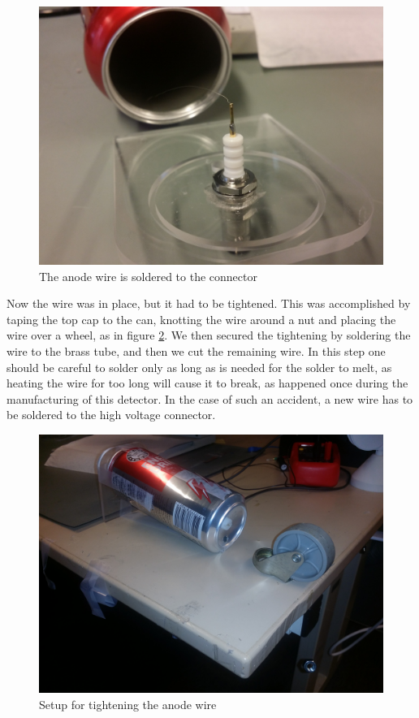 \documentclass[a4paper]{article}
\begin{document}
\begin{figure}[ht!]
\centering
\includegraphics[width=\textwidth]{fig/IMG_20201117_121044.jpg}
\caption{The anode wire is soldered to the connector}
\label{fig:connector}
\end{figure}

Now the wire was in place, but it had to be tightened.
This was accomplished by taping the top cap to the can, knotting the wire around a nut and placing the wire over a wheel, as in figure \ref{fig:tightening}.
We then secured the tightening by soldering the wire to the brass tube, and then we cut the remaining wire.
In this step one should be careful to solder only as long as is needed for the solder to melt, as heating the wire for too long will cause it to break, as happened once during the manufacturing of this detector.
In the case of such an accident, a new wire has to be soldered to the high voltage connector.

\begin{figure}[ht!]
\centering
\includegraphics[width=\textwidth]{fig/IMG_20201123_104201.jpg}
\caption{Setup for tightening the anode wire}
\label{fig:tightening}
\end{figure}
\end{document}
